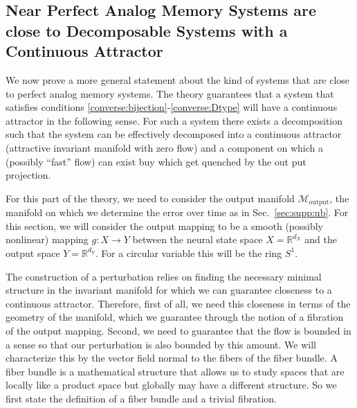 \documentclass{article} %
\newcounter{ct}
\newcommand{\reals}{\mathbb{R}}
\newcommand{\manifold}{\mathcal{M}}
\theoremstyle{definition}
\theoremstyle{remark}
\begin{document}
\subsection{Near Perfect Analog Memory Systems are close to Decomposable Systems with a Continuous Attractor}\label{sec:near_ca}

We now prove a more general statement about the kind of systems that are close to perfect analog memory systems.
The theory guarantees that a system that satisfies conditions \ref{converse:bijection}-\ref{converse:Dtype}  will have a continuous attractor in the following sense.
For such a system there exists a decomposition such that the system can be effectively decomposed into a continuous attractor (attractive invariant manifold with zero flow) and a component on which a (possibly ``fast'' flow) can exist buy which get quenched by the out put projection.

For this part of the theory, we need to consider the output manifold \(\manifold_{\text{output}}\), the manifold on which we determine the error over time as in Sec.~\ref{sec:supp:ub}.
For this section, we will consider the output mapping to be a smooth (possibly nonlinear) mapping \(g\colon X\rightarrow Y\) between the neural state space \(X=\reals^{d_X}\) and the output space \(Y=\reals^{d_Y}\).
For a circular variable this will be the ring \(S^1\).

The construction of a perturbation relies on finding the necessary minimal structure in the invariant manifold for which we can guarantee closeness to a continuous attractor.
Therefore, first of all, we need this closeness in terms of the geometry of the manifold, which we guarantee through the notion of a fibration of the output mapping.
Second, we need to guarantee that the flow is bounded in a sense so that our perturbation is also bounded by this amount.
We will characterize this by the vector field normal to the fibers of the fiber bundle.
A fiber bundle is a mathematical structure that allows us to study spaces that are locally like a product space but globally may have a different structure.
So we first state the definition of a fiber bundle and a trivial fibration.
\end{document}
